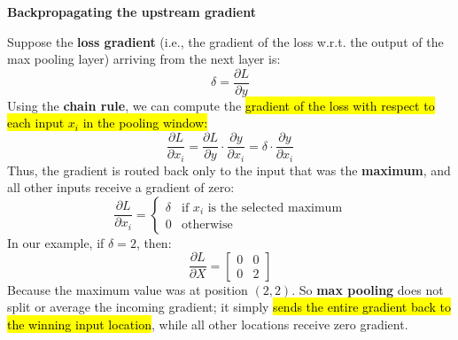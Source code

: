 \highspace
\begin{flushleft}
    \textcolor{Green3}{ \textbf{Backpropagating the upstream gradient}}
\end{flushleft}
Suppose the \textbf{loss gradient} (i.e., the gradient of the loss w.r.t. the output of the max pooling layer) arriving from the next layer is:
\begin{equation*}
    \delta = \frac{\partial L}{\partial y}
\end{equation*}
Using the \textbf{chain rule}, we can compute the \hl{gradient of the loss with respect to each input $x_i$ in the pooling window:}
\begin{equation*}
    \frac{\partial L}{\partial x_i} = \frac{\partial L}{\partial y} \cdot \frac{\partial y}{\partial x_i} = \delta \cdot \frac{\partial y}{\partial x_i}
\end{equation*}
Thus, the gradient is routed back only to the input that was the \textbf{maximum}, and all other inputs receive a gradient of zero:
\begin{equation*}
    \frac{\partial L}{\partial x_i} =
    \begin{cases}
        \delta & \text{if } x_i \text{ is the selected maximum}\\
        0 & \text{otherwise}
    \end{cases}
\end{equation*}
In our example, if $\delta = 2$, then:
\begin{equation*}
    \frac{\partial L}{\partial X} =
    \begin{bmatrix}
        0 & 0\\
        0 & 2
    \end{bmatrix}
\end{equation*}
Because the maximum value was at position $(2, 2)$. So \textbf{max pooling} does not split or average the incoming gradient; it simply \hl{sends the entire gradient back to the winning input location}, while all other locations receive zero gradient.


